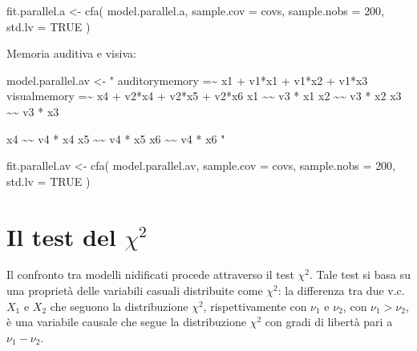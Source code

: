 \documentclass[
  11pt,
]{krantz}
\makeatletter
\newenvironment{Shaded}{\begin{snugshade}}{\end{snugshade}}
\newcommand{\AttributeTok}[1]{\textcolor[rgb]{0.61,0.61,0.61}{#1}}
\newcommand{\ConstantTok}[1]{\textcolor[rgb]{0,0,0}{#1}}
\newcommand{\DecValTok}[1]{\textcolor[rgb]{0.06,0.06,0.06}{#1}}
\newcommand{\FunctionTok}[1]{\textcolor[rgb]{0,0,0}{#1}}
\newcommand{\NormalTok}[1]{#1}
\newcommand{\OtherTok}[1]{\textcolor[rgb]{0.37,0.37,0.37}{#1}}
\newcommand{\StringTok}[1]{\textcolor[rgb]{0.5,0.5,0.5}{#1}}
\newenvironment{kframe}{%
\medskip{}
\setlength{\fboxsep}{.8em}
 \def\at@end@of@kframe{}%
 \ifinner\ifhmode%
  \def\at@end@of@kframe{\end{minipage}}%
  \begin{minipage}{\columnwidth}%
 \fi\fi%
 \def\FrameCommand##1{\hskip\@totalleftmargin \hskip-\fboxsep
 \colorbox{shadecolor}{##1}\hskip-\fboxsep
     \hskip-\linewidth \hskip-\@totalleftmargin \hskip\columnwidth}%
 \MakeFramed {\advance\hsize-\width
   \@totalleftmargin\z@ \linewidth\hsize
   \@setminipage}}%
 {\par\unskip\endMakeFramed%
 \at@end@of@kframe}
\renewenvironment{Shaded}{\begin{kframe}}{\end{kframe}}
\theoremstyle{definition}
\theoremstyle{definition}
\theoremstyle{definition}
\theoremstyle{definition}
\theoremstyle{remark}
\makeatother
\begin{document}
\begin{Shaded}
\begin{Highlighting}[]
\NormalTok{fit.parallel.a }\OtherTok{\textless{}{-}} \FunctionTok{cfa}\NormalTok{(}
\NormalTok{  model.parallel.a,}
  \AttributeTok{sample.cov =}\NormalTok{ covs,}
  \AttributeTok{sample.nobs =} \DecValTok{200}\NormalTok{,}
  \AttributeTok{std.lv =} \ConstantTok{TRUE}
\NormalTok{)}
\end{Highlighting}
\end{Shaded}

Memoria auditiva e visiva:

\begin{Shaded}
\begin{Highlighting}[]
\NormalTok{model.parallel.av }\OtherTok{\textless{}{-}} \StringTok{"}
\StringTok{  auditorymemory =\textasciitilde{} x1 + v1*x1 + v1*x2 + v1*x3}
\StringTok{  visualmemory   =\textasciitilde{} x4 + v2*x4 + v2*x5 + v2*x6}
\StringTok{  x1 \textasciitilde{}\textasciitilde{} v3 * x1}
\StringTok{  x2 \textasciitilde{}\textasciitilde{} v3 * x2}
\StringTok{  x3 \textasciitilde{}\textasciitilde{} v3 * x3}

\StringTok{  x4 \textasciitilde{}\textasciitilde{} v4 * x4}
\StringTok{  x5 \textasciitilde{}\textasciitilde{} v4 * x5}
\StringTok{  x6 \textasciitilde{}\textasciitilde{} v4 * x6}
\StringTok{"}
\end{Highlighting}
\end{Shaded}

\begin{Shaded}
\begin{Highlighting}[]
\NormalTok{fit.parallel.av }\OtherTok{\textless{}{-}} \FunctionTok{cfa}\NormalTok{(}
\NormalTok{  model.parallel.av,}
  \AttributeTok{sample.cov =}\NormalTok{ covs,}
  \AttributeTok{sample.nobs =} \DecValTok{200}\NormalTok{,}
  \AttributeTok{std.lv =} \ConstantTok{TRUE}
\NormalTok{)}
\end{Highlighting}
\end{Shaded}

\hypertarget{il-test-del-chi2}{%
\section{\texorpdfstring{Il test del \(\chi^2\)}{Il test del \textbackslash chi\^{}2}}\label{il-test-del-chi2}}

Il confronto tra modelli nidificati procede attraverso il test \(\chi^2\). Tale test si basa su una proprietà delle variabili casuali distribuite come \(\chi^2\): la differenza tra due v.c. \(X_1\) e \(X_2\) che seguono la distribuzione \(\chi^2\), rispettivamente con \(\nu_1\) e \(\nu_2\), con \(\nu_1 > \nu_2\), è una variabile causale che segue la distribuzione \(\chi^2\) con gradi di libertà pari a \(\nu_1 - \nu_2\).
\end{document}
